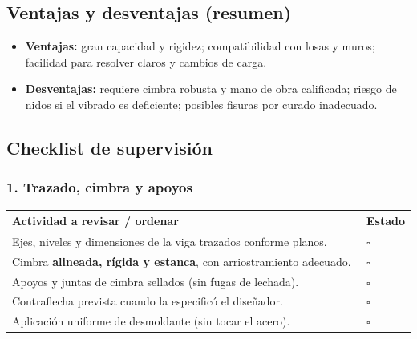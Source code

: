 \documentclass[12pt]{article}
\newcommand{\cbox}{\(\square\)}
\renewcommand{\cbox}{\(\square\)} %
\begin{document}
	\subsection*{Ventajas y desventajas (resumen)}
	\begin{itemize}[leftmargin=*, itemsep=2pt]
		\item \textbf{Ventajas:} gran capacidad y rigidez; compatibilidad con losas y muros; facilidad para resolver claros y cambios de carga.
		\item \textbf{Desventajas:} requiere cimbra robusta y mano de obra calificada; riesgo de nidos si el vibrado es deficiente; posibles fisuras por curado inadecuado.
	\end{itemize}
	
	\subsection{Checklist de supervisión}
	
	\subsubsection*{1. Trazado, cimbra y apoyos}
	\begin{tabularx}{\linewidth}{>{\raggedright\arraybackslash}p{0.93\linewidth} >{\centering\arraybackslash}m{0.07\linewidth}}
		\toprule
		\textbf{Actividad a revisar / ordenar} & \textbf{Estado}\\
		\midrule
		Ejes, niveles y dimensiones de la viga trazados conforme planos. & \cbox \\
		Cimbra \textbf{alineada, rígida y estanca}, con arriostramiento adecuado. & \cbox \\
		Apoyos y juntas de cimbra sellados (sin fugas de lechada). & \cbox \\
		Contraflecha prevista cuando la especificó el diseñador. & \cbox \\
		Aplicación uniforme de desmoldante (sin tocar el acero). & \cbox \\
		\bottomrule
	\end{tabularx}
	
\end{document}
